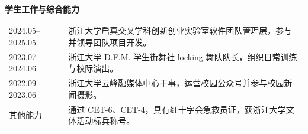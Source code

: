 \vspace{0.1em}
\textbf{学生工作与综合能力}

\begin{tabularx}{\textwidth}{@{}p{}X@{}}
    2024.05--2025.05 & 浙江大学启真交叉学科创新创业实验室软件团队管理层，参与并领导团队项目开发。 \\
    2023.07--2024.06 & 浙江大学 D.F.M. 学生街舞社 locking 舞队队长，组织日常训练与校际演出。 \\
    2022.09--2023.06 & 浙江大学云峰融媒体中心干事，运营校园公众号并参与校园新闻摄影。 \\
    其他能力 & 通过 CET-6、CET-4，具有红十字会急救员证，获浙江大学文体活动标兵称号。 \\
\end{tabularx}

\endgroup
